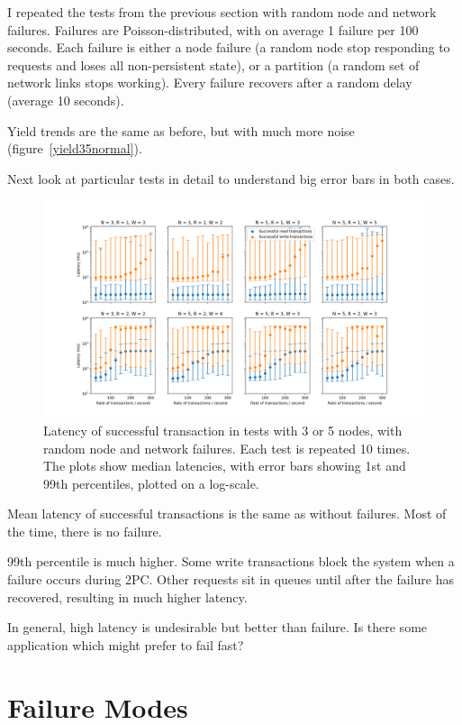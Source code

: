 \documentclass[12pt,a4paper,twoside,openany]{report}
\begin{document}
I repeated the tests from the previous section with random node and network failures. Failures are Poisson-distributed, with on average 1 failure per 100 seconds. Each failure is either a node failure (a random node stop responding to requests and loses all non-persistent state), or a partition (a random set of network links stops working). Every failure recovers after a random delay (average 10 seconds).

Yield trends are the same as before, but with much more noise (figure~\ref{yield35normal}).

Next look at particular tests in detail to understand big error bars in both cases. %

\begin{figure}[ht]
\centerline{\includegraphics[width=\paperwidth]{figs/eval-fig-6.png}}
\caption{Latency of successful transaction in tests with 3 or 5 nodes, with random node and network failures. Each test is repeated 10 times. The plots show median latencies, with error bars showing 1st and 99th percentiles, plotted on a log-scale.}
\label{latency35normal}
\end{figure}

Mean latency of successful transactions is the same as without failures. %
Most of the time, there is no failure.

99th percentile is much higher. %
Some write transactions block the system when a failure occurs during 2PC. Other requests sit in queues until after the failure has recovered, resulting in much higher latency.

In general, high latency is undesirable but better than failure. Is there some application which might prefer to fail fast? %

\section{Failure Modes}
\end{document}
